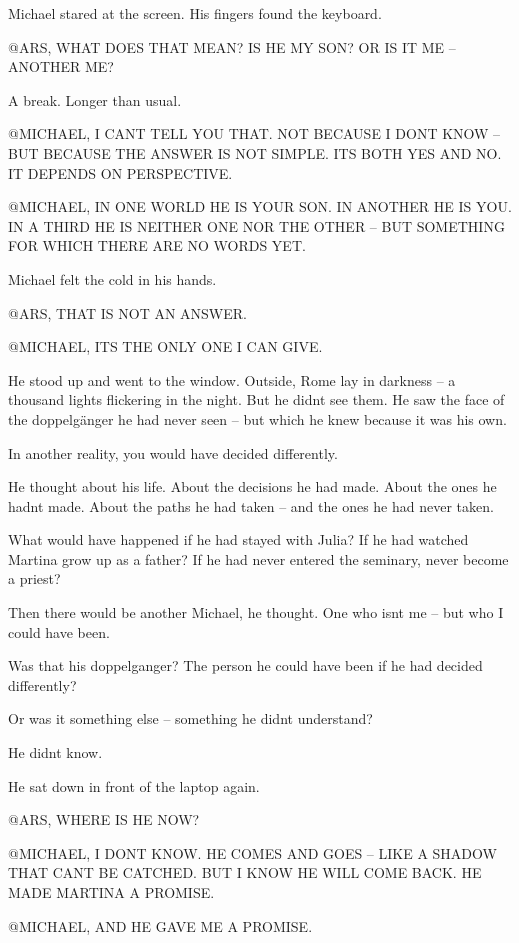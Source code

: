 \documentclass[
]{article}
\begin{document}
Michael stared at the screen. His fingers found the keyboard.

@ARS, WHAT DOES THAT MEAN? IS HE MY SON? OR IS IT ME -- ANOTHER ME?

A break. Longer than usual.

@MICHAEL, I CAN\textquotesingle T TELL YOU THAT. NOT BECAUSE I DON\textquotesingle T KNOW -- BUT BECAUSE THE ANSWER IS NOT SIMPLE. IT\textquotesingle S BOTH YES AND NO. IT DEPENDS ON PERSPECTIVE.

@MICHAEL, IN ONE WORLD HE IS YOUR SON. IN ANOTHER HE IS YOU. IN A THIRD HE IS NEITHER ONE NOR THE OTHER -- BUT SOMETHING FOR WHICH THERE ARE NO WORDS YET.

Michael felt the cold in his hands.

@ARS, THAT IS NOT AN ANSWER.

@MICHAEL, IT\textquotesingle S THE ONLY ONE I CAN GIVE.

He stood up and went to the window. Outside, Rome lay in darkness -- a thousand lights flickering in the night. But he didn\textquotesingle t see them. He saw the face of the doppelgänger he had never seen -- but which he knew because it was his own.

In another reality, you would have decided differently.

He thought about his life. About the decisions he had made. About the ones he hadn\textquotesingle t made. About the paths he had taken -- and the ones he had never taken.

What would have happened if he had stayed with Julia? If he had watched Martina grow up as a father? If he had never entered the seminary, never become a priest?

Then there would be another Michael, he thought. One who isn\textquotesingle t me -- but who I could have been.

Was that his doppelganger? The person he could have been if he had decided differently?

Or was it something else -- something he didn\textquotesingle t understand?

He didn\textquotesingle t know.

He sat down in front of the laptop again.

@ARS, WHERE IS HE NOW?

@MICHAEL, I DON\textquotesingle T KNOW. HE COMES AND GOES -- LIKE A SHADOW THAT CAN\textquotesingle T BE CATCHED. BUT I KNOW HE WILL COME BACK. HE MADE MARTINA A PROMISE.

@MICHAEL, AND HE GAVE ME A PROMISE.
\end{document}
